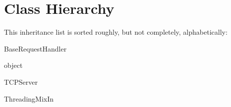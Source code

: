 \section{Class Hierarchy}
This inheritance list is sorted roughly, but not completely, alphabetically\+:\begin{DoxyCompactList}
\item Base\+Request\+Handler\begin{DoxyCompactList}
\item {}
\end{DoxyCompactList}
\item object\begin{DoxyCompactList}
\item {}
\item {}
\item {}
\item {}
\end{DoxyCompactList}
\item T\+C\+P\+Server\begin{DoxyCompactList}
\item {}
\end{DoxyCompactList}
\item Threading\+Mix\+In\begin{DoxyCompactList}
\item {}
\end{DoxyCompactList}
\end{DoxyCompactList}
